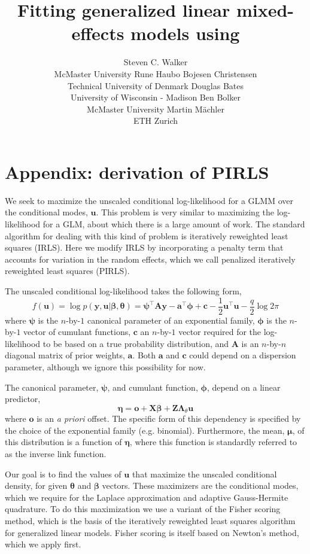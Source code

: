 \documentclass{jss}
\author{
  Steven C. Walker\\McMaster University \And
  Rune Haubo Bojesen Christensen\\Technical University of Denmark\AND
  Douglas Bates\\University of Wisconsin - Madison \And
  Ben Bolker\\McMaster University \AND
  Martin M\"achler\\ETH Zurich
}
\title{Fitting generalized linear \bmb{and nonlinear?} mixed-effects models using \pkg{lme4}}
\begin{document}

\section{Appendix: derivation of PIRLS}

We seek to maximize the unscaled conditional log-likelihood for a GLMM
over the conditional modes, $\bm u$. This problem is very similar to
maximizing the log-likelihood for a GLM, about which there is a large
amount of work. The standard algorithm for dealing with this kind of
problem is iteratively reweighted least squares (IRLS). Here we modify
IRLS by incorporating a penalty term that accounts for variation in
the random effects, which we call penalized iteratively reweighted
least squares (PIRLS).

The unscaled conditional log-likelihood takes the following form,
\begin{equation}
  f(\bm u) = \log p(\bm y, \bm u | \bm\beta, \bm\theta) = 
  \bm\psi^\top \bm A \bm y - 
  \bm a^\top \bm \phi  + 
  \bm c -
  \frac{1}{2}\bm u^\top \bm u -
  \frac{q}{2}\log{2\pi}
\end{equation}
where $\bm\psi$ is the $n$-by-$1$ canonical parameter of an
exponential family, $\bm\phi$ is the $n$-by-$1$ vector of cumulant
functions, $\bm c$ an $n$-by-$1$ vector required for the
log-likelihood to be based on a true probability distribution, and
$\bm A$ is an $n$-by-$n$ diagonal matrix of prior weights, $\bm
a$. Both $\bm a$ and $\bm c$ could depend on a dispersion parameter,
although we ignore this possibility for now.

The canonical parameter, $\bm\psi$, and cumulant function, $\bm\phi$,
depend on a linear predictor,
\begin{equation}
  \bm\eta = \bm o + \bm X \bm\beta + \bm Z \bm\Lambda_\theta \bm u
\end{equation}
where $\bm o$ is an \emph{a priori} offset. The specific form of this
dependency is specified by the choice of the exponential family
(e.g. binomial). Furthermore, the mean, $\bm\mu$, of this distribution
is a function of $\bm\eta$, where this function is standardly referred
to as the inverse link function.

Our goal is to find the values of $\bm u$ that maximize the unscaled
conditional density, for given $\bm\theta$ and $\bm\beta$
vectors. These maximizers are the conditional modes, which we require
for the Laplace approximation and adaptive Gauss-Hermite
quadrature. To do this maximization we use a variant of the Fisher
scoring method, which is the basis of the iteratively reweighted least
squares algorithm for generalized linear models. Fisher scoring is
itself based on Newton's method, which we apply first.
\end{document}
